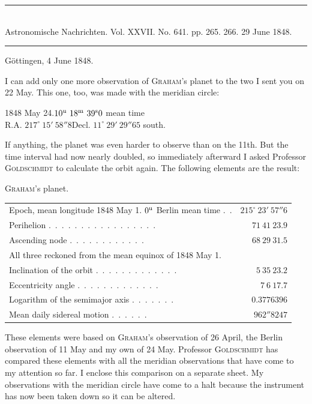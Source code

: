 \clearpage
\hypertarget{native-482-june4}{}
\begin{center}
\rule{0.55\linewidth}{0.4pt}\\[2pt]
Astronomische Nachrichten. Vol. XXVII. No. 641. pp. 265. 266. 29 June 1848.\\[2pt]
\rule{0.55\linewidth}{0.4pt}
\end{center}
\begin{flushright}Göttingen, 4 June 1848.\end{flushright}

I can add only one more observation of \textsc{Graham}’s planet to the two I sent you on 22 May. This one, too, was made with the meridian circle:

\begin{center}
1848 May 24.\quad $10^{\rm u}\ 18^{\rm m}\ 39^{\rm s}0$ mean time\\
R.A. $217^\circ\ 15'\ 58''8$\qquad Decl. $11^\circ\ 29'\ 29''65$ south.
\end{center}

If anything, the planet was even harder to observe than on the 11th. But the time interval had now nearly doubled, so immediately afterward I asked Professor \textsc{Goldschmidt} to calculate the orbit again. The following elements are the result:

\begin{center}
\textsc{Graham}’s planet.\\[3pt]
\small
\setlength{\tabcolsep}{3pt}
\begin{tabular}{lr}
Epoch, mean longitude 1848 May 1. $0^{\rm u}$ Berlin mean time \mbox{.\ .} & $215^\circ\ 23'\ 57''6$ \\
Perihelion \mbox{.\ .\ .\ .\ .\ .\ .\ .\ .\ .\ .\ .\ .\ .\ .\ .\ .} & $71\ 41\ 23.9$ \\
Ascending node \mbox{.\ .\ .\ .\ .\ .\ .\ .\ .\ .\ .\ .} & $68\ 29\ 31.5$ \\
\multicolumn{2}{l}{\quad All three reckoned from the mean equinox of 1848 May 1.} \\
Inclination of the orbit \mbox{.\ .\ .\ .\ .\ .\ .\ .\ .\ .\ .\ .\ .} & $5\ 35\ 23.2$ \\
Eccentricity angle \mbox{.\ .\ .\ .\ .\ .\ .\ .\ .\ .\ .\ .\ .} & $7\ 6\ 17.7$ \\
Logarithm of the semimajor axis \mbox{.\ .\ .\ .\ .\ .\ .} & $0.3776396$ \\
Mean daily sidereal motion \mbox{.\ .\ .\ .\ .\ .} & $962''8247$ \\
\end{tabular}
\end{center}

These elements were based on \textsc{Graham}’s observation of 26 April, the Berlin observation of 11 May and my own of 24 May. Professor \textsc{Goldschmidt} has compared these elements with all the meridian observations that have come to my attention so far. I enclose this comparison on a separate sheet. My observations with the meridian circle have come to a halt because the instrument has now been taken down so it can be altered.
